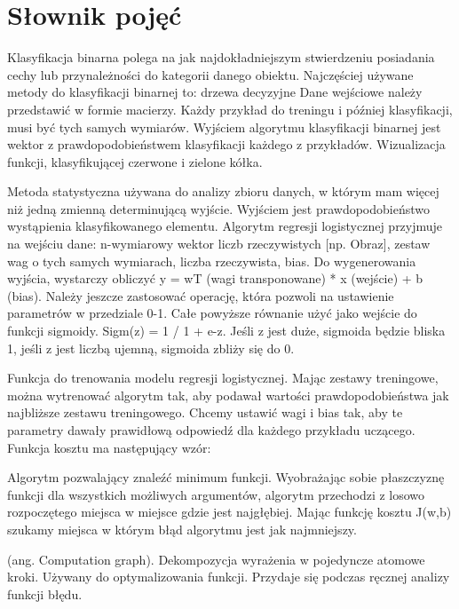 \documentclass[12pt,a4paper,twoside,titlepage,openright]{book}
\begin{document}
\chapter*{Słownik pojęć}
\begin{description}[style=nextline]
	\item[Klasyfikacja binarna] Klasyfikacja binarna polega na jak najdokładniejszym stwierdzeniu posiadania cechy lub przynależności do kategorii danego obiektu.
Najczęściej używane metody do klasyfikacji binarnej to: drzewa decyzyjne 
Dane wejściowe należy przedstawić w formie macierzy. Każdy przykład do treningu i później klasyfikacji, musi być tych samych wymiarów. Wyjściem algorytmu klasyfikacji binarnej jest wektor z prawdopodobieństwem klasyfikacji każdego z przykładów. Wizualizacja funkcji, klasyfikującej czerwone i zielone kółka.
	\item[Regresja logistyczna] Metoda statystyczna używana do analizy zbioru danych, w którym mam więcej niż jedną zmienną determinującą wyjście. Wyjściem jest prawdopodobieństwo wystąpienia klasyfikowanego elementu. Algorytm regresji logistycznej przyjmuje na wejściu dane: n-wymiarowy wektor liczb rzeczywistych [np. Obraz], zestaw wag o tych samych wymiarach, liczba rzeczywista, bias.
Do wygenerowania wyjścia, wystarczy obliczyć y = wT (wagi transponowane) * x (wejście) + b (bias). Należy jeszcze zastosować operację, która pozwoli na ustawienie parametrów w przedziale 0-1. Całe powyższe równanie użyć jako wejście do funkcji sigmoidy. Sigm(z) = 1 / 1 + e-z. Jeśli z jest duże, sigmoida będzie bliska 1, jeśli z jest liczbą ujemną, sigmoida zbliży się do 0.
	\item[Funkcja kosztu] Funkcja do trenowania modelu regresji logistycznej. Mając zestawy treningowe, można wytrenować algorytm tak, aby podawał wartości prawdopodobieństwa jak najbliższe zestawu treningowego. Chcemy ustawić wagi i bias tak, aby te parametry dawały prawidłową odpowiedź dla każdego przykładu uczącego. Funkcja kosztu ma następujący wzór:
	\item[Metoda gradientu prostego] Algorytm pozwalający znaleźć minimum funkcji. Wyobrażając sobie płaszczyznę funkcji dla wszystkich możliwych argumentów, algorytm przechodzi z losowo rozpoczętego miejsca w miejsce gdzie jest najgłębiej. Mając funkcję kosztu J(w,b) szukamy miejsca w którym błąd algorytmu jest jak najmniejszy.
	\item[Wykres obliczeniowy] (ang. Computation graph). Dekompozycja wyrażenia w pojedyncze atomowe kroki. Używany do optymalizowania funkcji. Przydaje się podczas ręcznej analizy funkcji błędu.

\end{description}
\end{document}
